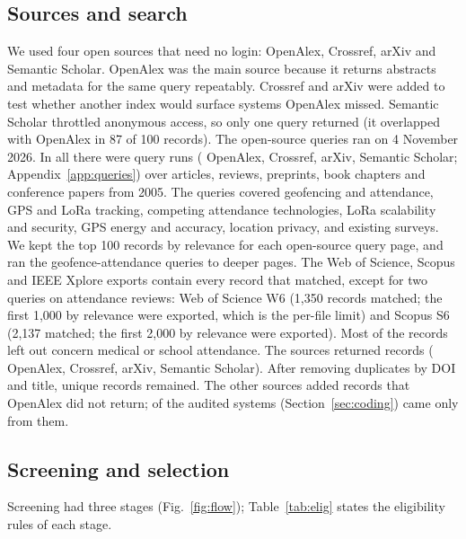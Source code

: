 \documentclass[preprint,12pt]{elsarticle}
\begin{document}
\subsection{Sources and search}
We used four open sources that need no login: OpenAlex, Crossref, arXiv and Semantic Scholar. OpenAlex was the main source because it returns abstracts and metadata for the same query repeatably. Crossref and arXiv were added to test whether another index would surface systems OpenAlex missed. Semantic Scholar throttled anonymous access, so only one query returned (it overlapped with OpenAlex in 87 of 100 records). \srcMissing{} The open-source queries ran on 4 November 2026. In all there were \nQueriesAll{} query runs (\nQueriesOA{} OpenAlex, \nQueriesCR{} Crossref, \nQueriesAX{} arXiv, \nQueriesSS{} Semantic Scholar\srcQueryExtra{}; Appendix~\ref{app:queries}) over articles, reviews, preprints, book chapters and conference papers from 2005. The queries covered geofencing and attendance, GPS and LoRa tracking, competing attendance technologies, LoRa scalability and security, GPS energy and accuracy, location privacy, and existing surveys. We kept the top 100 records by relevance for each open-source query page, and ran the geofence-attendance queries to deeper pages. The Web of Science, Scopus and IEEE Xplore exports contain every record that matched, except for two queries on attendance reviews: Web of Science W6 (1,350 records matched; the first 1,000 by relevance were exported, which is the per-file limit) and Scopus S6 (2,137 matched; the first 2,000 by relevance were exported). Most of the records left out concern medical or school attendance. The sources returned \totRetrieved{} records (\srcOA{} OpenAlex, \srcCR{} Crossref, \srcAX{} arXiv, \srcSS{} Semantic Scholar\srcRecordsExtra{}). After removing duplicates by DOI and title, \unionUnique{} unique records remained. The other sources added \newOther{} records that OpenAlex did not return; \nAuditOnlyOther{} of the \nAudit{} audited systems (Section~\ref{sec:coding}) came only from them.

\subsection{Screening and selection}
Screening had three stages (Fig.~\ref{fig:flow}); Table~\ref{tab:elig} states the eligibility rules of each stage.
\end{document}
